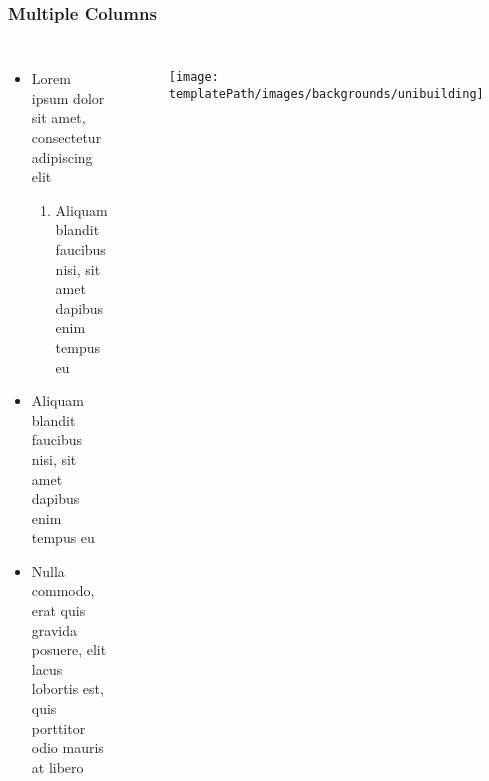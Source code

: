 \documentclass[aspectratio=169]{beamer}
\newcommand*{\templatePath}{./upb-theme}%
\begin{document}

\begin{frame}
	\frametitle{Multiple Columns}
	
	\begin{columns}[c]
		
		
		\begin{itemize}
			\item Lorem ipsum dolor sit amet, consectetur adipiscing elit
			\begin{enumerate}
				\item Aliquam blandit faucibus nisi, sit amet dapibus enim tempus eu
			\end{enumerate}
			\item Aliquam blandit faucibus nisi, sit amet dapibus enim tempus eu
			\item Nulla commodo, erat quis gravida posuere, elit lacus lobortis est, quis porttitor odio mauris at libero
		\end{itemize}
		
		\begin{figure}
			\texttt{[image: \\templatePath/images/backgrounds/unibuilding]}
		\end{figure}
		
		
	\end{columns}
	
\end{frame}

\end{document}

